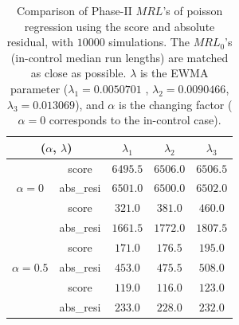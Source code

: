 \documentclass[twoside,11pt]{article}
\begin{document}
\begin{appendix}
\begin{table}[H]
\centering
\begin{tabular}{ccccc}
\toprule
\multicolumn{2}{c}{($ \alpha$, $ \lambda$)} & {$ \lambda_1$} & {$ \lambda_2$} & {$ \lambda_3$} \\
\midrule
\multirow{3}{*}{$\alpha=0$} & score &$6495.5$ & $6506.0$ & $6506.5$ \\
& abs\_resi &$6501.0$ & $6500.0$ & $6502.0$ \\
\midrule
\multirow{3}{*}{$\alpha=0.3$} & score &$\bm{321.0}$ & $\bm{381.0}$ & $\bm{460.0}$ \\
& abs\_resi &$1661.5$ & $1772.0$ & $1807.5$ \\
\midrule
\multirow{3}{*}{$\alpha=0.5$} & score &$\bm{171.0}$ & $\bm{176.5}$ & $\bm{195.0}$ \\
& abs\_resi &$453.0$ & $475.5$ & $508.0$ \\
\midrule
\multirow{3}{*}{$\alpha=0.7$} & score &$\bm{119.0}$ & $\bm{116.0}$ & $\bm{123.0}$ \\
& abs\_resi &$233.0$ & $228.0$ & $232.0$ \\
\midrule
\end{tabular}
\caption{Comparison of Phase-II $MRL$'s of poisson regression using the score and absolute residual, with $10000$ simulations. The $MRL_0$'s (in-control median run lengths) are matched as close as possible. $ \lambda$ is the EWMA parameter ({$ \lambda_1=0.0050701$} , {$ \lambda_2=0.0090466$}, {$ \lambda_3=0.013069$}), and $\alpha$ is the changing factor ($ \alpha=0$ corresponds to the in-control case).}
\label{tab:pois_MRL}
\end{table}


\end{appendix}
\end{document}
